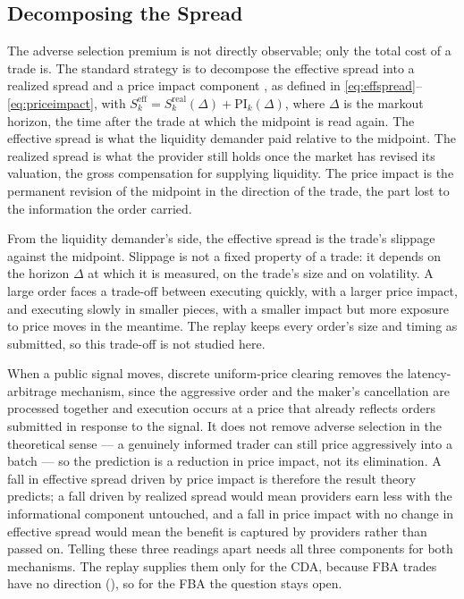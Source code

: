 \subsection{Decomposing the Spread}
\label{sec:spread-decomposition}

The adverse selection premium is not directly observable; only the total
cost of a trade is. The standard strategy is to decompose the effective
spread into a realized spread and a price impact component
\citep{hasbrouck1993assessing,hendershott2011algorithmic}, as defined in
\eqref{eq:effspread}--\eqref{eq:priceimpact}, with $S^{\mathrm{eff}}_k =
S^{\mathrm{real}}_k(\Delta) + \mathrm{PI}_k(\Delta)$, where $\Delta$ is the
markout horizon, the time after the trade at which the midpoint is read
again. The effective spread is what the liquidity demander paid relative
to the midpoint. The realized spread is what the provider still holds
once the market has revised its valuation, the gross compensation for
supplying liquidity. The price impact is the permanent revision of the
midpoint in the direction of the trade, the part lost to the information
the order carried.

From the liquidity demander's side, the effective spread is the trade's
slippage against the midpoint. Slippage is not a fixed property of a
trade: it depends on the horizon $\Delta$ at which it is measured, on the
trade's size and on volatility. A large order faces a trade-off between
executing quickly, with a larger price impact, and executing slowly in
smaller pieces, with a smaller impact but more exposure to price moves in
the meantime. The replay keeps every order's size and timing as
submitted, so this trade-off is not studied here.

When a public signal moves, discrete uniform-price clearing removes the
latency-arbitrage mechanism, since the aggressive order and the maker's
cancellation are processed together and execution occurs at a price that
already reflects orders submitted in response to the signal. It does not
remove adverse selection in the theoretical sense --- a genuinely
informed trader can still price aggressively into a batch
\citep{eibelshauser2022fba} --- so the prediction is a reduction in
price impact, not its elimination. A fall in effective spread driven by
price impact is therefore the result theory predicts; a fall driven by
realized spread would mean providers earn less with the
informational component untouched, and a fall in price impact with no
change in effective spread would mean the benefit is captured by
providers rather than passed on. Telling these three readings apart
needs all three components for both mechanisms. The replay supplies them
only for the CDA, because FBA trades have no direction
(), so for the FBA the question stays open.

